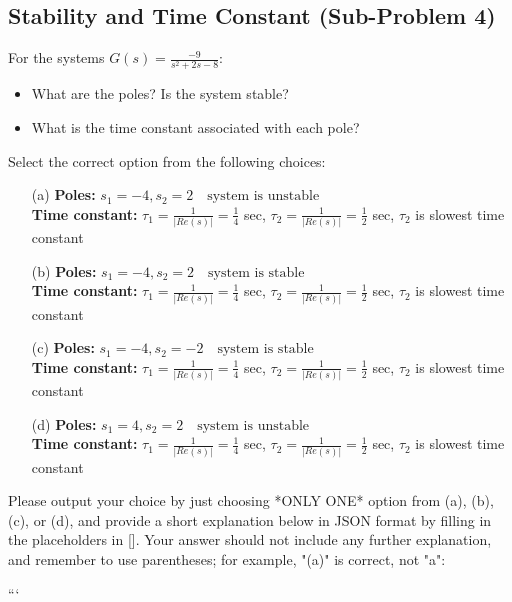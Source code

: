\documentclass[12pt]{article}
\begin{document}
\subsection*{Stability and Time Constant (Sub-Problem 4)}

For the systems \(G(s) = \frac{-9}{s^2 + 2s - 8}\):
\begin{itemize}
    \item What are the poles? Is the system stable?
    \item What is the time constant associated with each pole? 
\end{itemize}

Select the correct option from the following choices:
\begin{itemize}
    \item[(a)] \textbf{Poles:} \(s_1 = -4, s_2 = 2 \quad \text{system is unstable}\)\\
    \textbf{Time constant:} \(\tau_1 = \frac{1}{|Re(s)|} = \frac{1}{4}\) sec, \(\tau_2 = \frac{1}{|Re(s)|} = \frac{1}{2}\) sec, \(\tau_2\) is slowest time constant
    \item[(b)] \textbf{Poles:} \(s_1 = -4, s_2 = 2 \quad \text{system is stable}\)\\
    \textbf{Time constant:} \(\tau_1 = \frac{1}{|Re(s)|} = \frac{1}{4}\) sec, \(\tau_2 = \frac{1}{|Re(s)|} = \frac{1}{2}\) sec, \(\tau_2\) is slowest time constant
    \item[(c)] \textbf{Poles:} \(s_1 = -4, s_2 = -2 \quad \text{system is stable}\)\\
    \textbf{Time constant:} \(\tau_1 = \frac{1}{|Re(s)|} = \frac{1}{4}\) sec, \(\tau_2 = \frac{1}{|Re(s)|} = \frac{1}{2}\) sec, \(\tau_2\) is slowest time constant
    \item[(d)] \textbf{Poles:} \(s_1 = 4, s_2 = 2 \quad \text{system is unstable}\)\\
    \textbf{Time constant:} \(\tau_1 = \frac{1}{|Re(s)|} = \frac{1}{4}\) sec, \(\tau_2 = \frac{1}{|Re(s)|} = \frac{1}{2}\) sec, \(\tau_2\) is slowest time constant
\end{itemize}




Please output your choice by just choosing *ONLY ONE* option from (a), (b), (c), or (d), and provide a short explanation below in JSON format by filling in the placeholders in []. Your answer should not include any further explanation, and remember to use parentheses; for example, "(a)" is correct, not "a":

```
\end{document}
